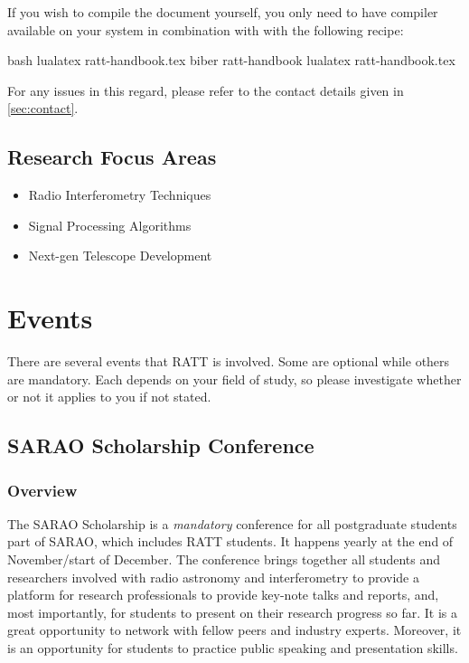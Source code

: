         If you wish to compile the document yourself, you only need to have  compiler available on your system in combination with  with the following recipe:

        \begin{rattcode}{bash}
            lualatex ratt-handbook.tex
            biber ratt-handbook
            lualatex ratt-handbook.tex
        \end{rattcode}

        For any issues in this regard, please refer to the contact details given in \cref{sec:contact}.

    \subsection{Research Focus Areas}
        \begin{itemize}
            \item Radio Interferometry Techniques
            \item Signal Processing Algorithms
            \item Next-gen Telescope Development
        \end{itemize}


\section{Events}\label{sec:2:events}
    There are several events that RATT is involved. Some are optional while others are mandatory. Each depends on your field of study, so please investigate whether or not it applies to you if not stated.

    \subsection{SARAO Scholarship Conference}\label{subsec:sarao_scholarship_conference}

    \subsubsection{Overview}\label{subsubsec:overview}
        The SARAO Scholarship is a \emph{mandatory} conference for all postgraduate students part of SARAO, which includes RATT students. It happens yearly at the end of November/start of December. The conference brings together all students and researchers involved with radio astronomy and interferometry to provide a platform for research professionals to provide key-note talks and reports, and, most importantly, for students to present on their research progress so far. It is a great opportunity to network with fellow peers and industry experts. Moreover, it is an opportunity for students to practice public speaking and presentation skills.


